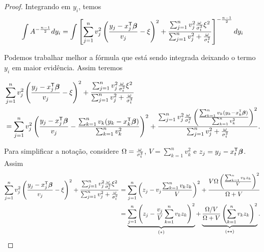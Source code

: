 \begin{proof}
Integrando em $y_i$, temos
\begin{equation}\label{eq:sn_marg_6}
\begin{split}
\int A^{-\frac{n-1}{2}} d y_i = \int \left[\sum_{j=1}^nv_j^2\left(\frac{y_j-x_j^{\mathsf{T}}{\boldsymbol{\beta}}}{v_j} - \xi\right)^2 + \frac{\sum_{j=1}^nv_j^2\frac{\omega}{\sigma^2_t}\xi^2}{\sum_{j=1}^nv_j^2+\frac{\omega}{\sigma^2_t}}\right]^{-\frac{n-1}{2}}d y_i
\end{split}
\end{equation}

Podemos trabalhar melhor a fórmula que está sendo integrada deixando o termo $y_i$ em maior evidência. Assim teremos

\begin{equation}
\begin{split}
& \sum_{j=1}^nv_j^2\left(\frac{y_j-x_j^{\mathsf{T}}{\boldsymbol{\beta}}}{v_j} - \xi\right)^2 + \frac{\sum_{j=1}^nv_j^2\frac{\omega}{\sigma^2_t}\xi^2}{\sum_{j=1}^nv_j^2+\frac{\omega}{\sigma^2_t}} \\
& = \sum_{j=1}^nv_j^2\left(\frac{y_j-x_j^{\mathsf{T}}{\boldsymbol{\beta}}}{v_j} - \frac{\sum_{k=1}^nv_k(y_k-x_k^{\mathsf{T}}{\boldsymbol{\beta}})}{\sum_{k=1}^nv_k^2}\right)^2 + \frac{\sum_{j=1}^nv_j^2\frac{\omega}{\sigma^2_t}\left(\frac{\sum_{k=1}^nv_k(y_k-x_k^{\mathsf{T}}{\boldsymbol{\beta}})}{\sum_{k=1}^nv_k^2}\right)^2}{\sum_{j=1}^nv_j^2+\frac{\omega}{\sigma^2_t}}.
\end{split}
\end{equation}

Para simplificar a notação, considere $\Omega = \frac{\omega}{\sigma^2_t}$, $V = \sum_{k=1}^nv_k^2$ e $z_j = y_j - x_t^{\mathsf{T}}{\boldsymbol{\beta}}$. Assim
\begin{equation}\label{eq:sn_marg_8}
\begin{split}
\sum_{j=1}^nv_j^2\left(\frac{y_j-x_j^{\mathsf{T}}{\boldsymbol{\beta}}}{v_j} - \xi\right)^2 + \frac{\sum_{j=1}^nv_j^2\frac{\omega}{\sigma^2_t}\xi^2}{\sum_{j=1}^nv_j^2+\frac{\omega}{\sigma^2_t}}  &= \sum_{j=1}^n\left(z_j - v_j\frac{\sum_{k=1}^nv_kz_k}{V}\right)^2 + \frac{V \Omega \left(\frac{\sum_{k=1}^nv_kz_k}{V}\right)^2}{\Omega + V} \\
{} & =\underbrace{\sum_{j=1}^n\left(z_j - \frac{v_j}{V}\sum_{k=1}^nv_kz_k\right)^2}_{(*)} + \underbrace{\frac{\Omega/V}{\Omega + V}  \left(\sum_{k=1}^nv_kz_k\right)^2}_{(**)}.
\end{split}
\end{equation}


\end{proof}
